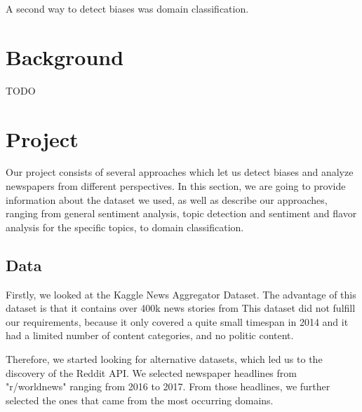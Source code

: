 \documentclass[final]{ieee}
\begin{document}
A second way to detect biases was domain classification.
            
            
\section{Background}
 
TODO
%            
%


\section{Project}

Our project consists of several approaches which let us detect biases and analyze newspapers from different perspectives. In this section, we are going to provide information about the dataset we used, as well as describe our approaches, ranging from general sentiment analysis, topic detection and sentiment and flavor analysis for the specific topics, to domain classification.

\subsection{Data}

Firstly, we looked at the Kaggle News Aggregator Dataset\cite{Lichman13}. The advantage of this dataset is that it contains over 400k news stories from 
This dataset did not fulfill our requirements, because it only covered a quite small timespan in 2014 and it had a limited number of content categories, and no politic content.

Therefore, we started looking for alternative datasets, which led us to the discovery of the Reddit API. We selected newspaper headlines from "r/worldnews" ranging from 2016 to 2017. From those headlines, we further selected the ones that came from the most occurring domains. %
\end{document}
